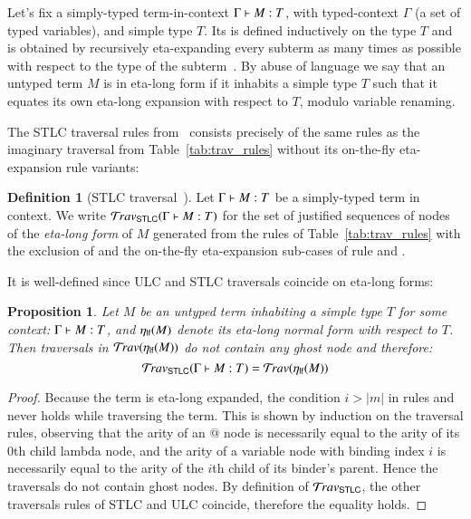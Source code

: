\documentclass{elsarticle}
\theoremstyle{plain}
\newtheorem{proposition}[theorem]{Proposition}
\theoremstyle{definition}
\newtheorem{definition}{Definition}[section]
\theoremstyle{remark}
\newcommand{\ghostlmd}{{\lambda\!\!\lambda}}
\newcommand{\travulc}{\travset}
\newcommand{\travstlc}{{\travset_{\sf STLC}}}
\begin{document}
Let's fix a simply-typed term-in-context $\Gamma \vdash M :T$, with typed-context $\Gamma$ (a set of typed variables), and simple type $T$. Its  is defined inductively on the type $T$ and is obtained by recursively eta-expanding every subterm as many times as possible with respect to the type of the subterm~\cite{Ong2006,BlumPhd}.
By abuse of language we say that an untyped term $M$ is in eta-long form if it inhabits a simple type $T$ such that it equates its own eta-long expansion with respect to $T$, modulo variable renaming.

The STLC traversal rules from~\cite{BlumPhd} consists precisely of the same rules as the imaginary traversal from Table~\ref{tab:trav_rules} without its on-the-fly eta-expansion rule variants:
\begin{definition}[STLC traversal~\cite{BlumPhd}]
Let $\Gamma \vdash M : T$ be a simply-typed term in context. We write $\travstlc(\Gamma \entail M : T)$ for the set of justified sequences of nodes of the \emph{eta-long form} of $M$ generated from the rules of Table~\ref{tab:trav_rules} with the exclusion of \rulenamet{Lam^\ghostlmd} and the on-the-fly eta-expansion sub-cases of rule  and .
\end{definition}

It is well-defined since ULC and STLC traversals coincide on eta-long forms:
\begin{proposition}
\label{prop:ulc_and_stlc_trav_coincide}
Let $M$ be an untyped term inhabiting a simple type $T$ for some context: $\Gamma \vdash M : T$, and $\eta_{\sf lf}(M)$ denote its \emph{eta-long normal form} with respect to $T$. Then traversals in $\travulc(\etalf{M})$ do not contain any ghost node and therefore:
$$\travstlc(\Gamma \entail M : T) = \travulc(\etalf{M})$$
\end{proposition}
\begin{proof}
Because the term is eta-long expanded, the condition $i>|m|$ in rules  and  never holds while traversing the term. This is shown by induction on the traversal rules, observing that the arity of an $@$ node is necessarily equal to the arity of its $0$th child lambda node, and the arity of a variable node with binding index $i$ is necessarily equal to the arity of the $i$th child of its binder's parent. Hence the traversals do not contain ghost nodes. By definition of $\travstlc$, the other traversals rules of STLC and ULC coincide, therefore the equality holds.
\end{proof}
\end{document}
